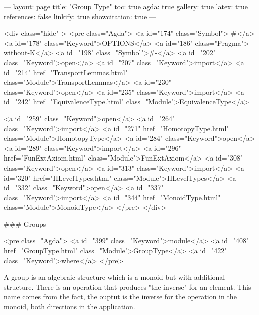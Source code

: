 ---
layout: page
title: "Group Type"
toc: true
agda: true
gallery: true
latex: true
references: false
linkify: true
showcitation: true
---

<div class="hide" >
<pre class="Agda">
<a id="174" class="Symbol">{-#</a> <a id="178" class="Keyword">OPTIONS</a> <a id="186" class="Pragma">--without-K</a> <a id="198" class="Symbol">#-}</a>
<a id="202" class="Keyword">open</a> <a id="207" class="Keyword">import</a> <a id="214" href="TransportLemmas.html" class="Module">TransportLemmas</a>
<a id="230" class="Keyword">open</a> <a id="235" class="Keyword">import</a> <a id="242" href="EquivalenceType.html" class="Module">EquivalenceType</a>

<a id="259" class="Keyword">open</a> <a id="264" class="Keyword">import</a> <a id="271" href="HomotopyType.html" class="Module">HomotopyType</a>
<a id="284" class="Keyword">open</a> <a id="289" class="Keyword">import</a> <a id="296" href="FunExtAxiom.html" class="Module">FunExtAxiom</a>
<a id="308" class="Keyword">open</a> <a id="313" class="Keyword">import</a> <a id="320" href="HLevelTypes.html" class="Module">HLevelTypes</a>
<a id="332" class="Keyword">open</a> <a id="337" class="Keyword">import</a> <a id="344" href="MonoidType.html" class="Module">MonoidType</a>
</pre>
</div>

### Groups

<pre class="Agda">
<a id="399" class="Keyword">module</a>
  <a id="408" href="GroupType.html" class="Module">GroupType</a>
    <a id="422" class="Keyword">where</a>
</pre>

A group is an algebraic structure which is a monoid but with additional structure.
There is an operation that produces "the inverse" for an element. This name
comes from the fact, the ouptut is the inverse for the operation in the monoid, both directions in the application.

